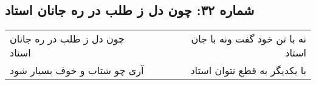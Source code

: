 \begin{center}
\section*{شماره ۳۲: چون دل ز طلب در ره جانان استاد}
\label{sec:032}
\begin{longtable}{l p{0.5cm} r}
چون دل ز طلب در ره جانان استاد
&&
نه با تن خود گفت ونه با جان استاد
\\
آری چو شتاب و خوف بسیار شود
&&
با یکدیگر به قطع نتوان استاد
\\
\end{longtable}
\end{center}
